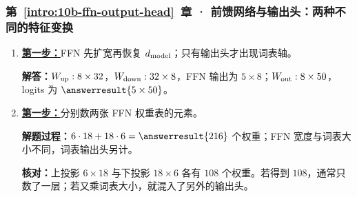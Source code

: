 \subsubsection*{第~\ref*{intro:10b-ffn-output-head}~章 · 前馈网络与输出头：两种不同的特征变换}
\begin{enumerate}[label={},leftmargin=4.8em,itemsep=4pt]
\item[\textbf{C-070.}] \leavevmode{}\label{solution:C-070}\label{solution:ffn-output-shapes}\hyperref[exercise:ffn-output-shapes]{\textbf{第一步：}}FFN 先扩宽再恢复 $d_{\rm model}$；只有输出头才出现词表轴。\par\nobreak
\textbf{解答：}$W_{\rm up}:8\times32$，$W_{\rm down}:32\times8$，FFN 输出为 $5\times8$；$W_{\rm out}:8\times50$，logits 为 $\answerresult{5\times50}$。
\item[\textbf{C-071.}] \leavevmode{}\label{solution:C-071}\label{solution:ffn-weight-count}\hyperref[exercise:ffn-weight-count]{\textbf{第一步：}}分别数两张 FFN 权重表的元素。\par\nobreak\textbf{解题过程：}$6\cdot18+18\cdot6=\answerresult{216}$ 个权重；FFN 宽度与词表大小不同，词表输出头另计。\par\textbf{核对：}上投影 $6\times18$ 与下投影 $18\times6$ 各有 $108$ 个权重。若得到 $108$，通常只数了一层；若又乘词表大小，就混入了另外的输出头。
\end{enumerate}
